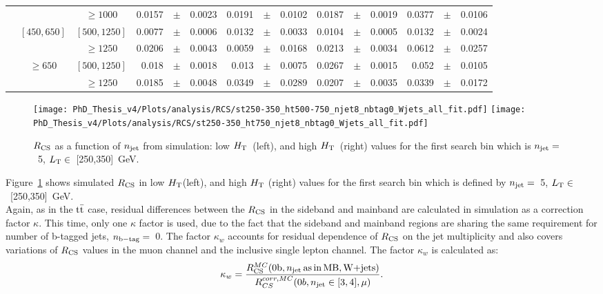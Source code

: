 \begin{table}[ht]
\begin{center}
{\begin{tabular}{c|c|c|rrr|rrr|rrr|rrr|}
&
&$\geq1000$
 & 0.0157&$\pm$&0.0023& 0.0191&$\pm$&0.0102& 0.0187&$\pm$&0.0019& 0.0377&$\pm$&0.0106
 \\
\cline{2-15}
&\multirow{2}{*}{$[450,650]$}
&$[500,1250]$
 & 0.0077&$\pm$&0.0006& 0.0132&$\pm$&0.0033& 0.0104&$\pm$&0.0005& 0.0132&$\pm$&0.0024
 \\
&
&$\geq1250$
 & 0.0206&$\pm$&0.0043& 0.0059&$\pm$&0.0168& 0.0213&$\pm$&0.0034& 0.0612&$\pm$&0.0257
 \\
\cline{2-15}
&\multirow{2}{*}{$\geq650$}
&$[500,1250]$
 & 0.018&$\pm$&0.0018& 0.013&$\pm$&0.0075& 0.0267&$\pm$&0.0015& 0.052&$\pm$&0.0105
 \\
&
&$\geq1250$
 & 0.0185&$\pm$&0.0048& 0.0349&$\pm$&0.0289& 0.0207&$\pm$&0.0035& 0.0339&$\pm$&0.0172
 \\
\cline{2-15}
\hline\end{tabular}}\end{center}\end{table}
\begin{figure}[!hbt]
    \begin{center}
 \texttt{[image: PhD\_Thesis\_v4/Plots/analysis/RCS/st250-350\_ht500-750\_njet8\_nbtag0\_Wjets\_all\_fit.pdf]}
   \texttt{[image: PhD\_Thesis\_v4/Plots/analysis/RCS/st250-350\_ht750\_njet8\_nbtag0\_Wjets\_all\_fit.pdf]}
  \caption[Simulated $\Rcs$ for $\wJets$ events]{ \label{RCS_dataMCw} $\Rcs$ as a function of $n_{\rm jet}$ from simulation:  low $H_{\rm T}$~(left), and high $H_{\rm T}$~(right) values for the first search bin which is $n_{\rm jet} =$~5, $L_{\rm T} \in$~[250,350]~GeV.}
  \end{center}
\end{figure}
Figure~\ref{RCS_dataMCw} shows simulated $\Rcs$ in low $H_{\rm T}$(left), and high $H_{\rm T}$ (right) values for the first search bin which is defined by $n_{\rm jet} =$~5, $L_{\rm T} \in$~[250,350]~GeV.\\
Again, as in the $\rm t\bar{t}$ case, residual differences between the $\Rcs$ in the sideband and mainband are calculated in simulation as a correction factor $\kappa$. This time, only one $\kappa$ factor is used, due to the fact that the sideband and mainband regions are sharing the same requirement for number of b-tagged jets, $n_{\rm b-tag}=$~0. The factor $\kappa_w$ accounts for residual dependence of $\Rcs$ on the jet multiplicity and also covers variations of $\Rcs$ values in the muon channel and the inclusive single lepton channel. The factor $\kappa_w$ is calculated as:
\begin{equation}
\label{kappa_w}
\kappa_w = \frac{R_{\rm CS}^{MC}({\rm 0b},n_{\rm jet} {\rm \,as\,in\,MB},\textrm{W+jets})}{R^{corr, MC}_{CS}(0b,n_{\rm jet} \in [3,4],\mu)}.
\end{equation}
